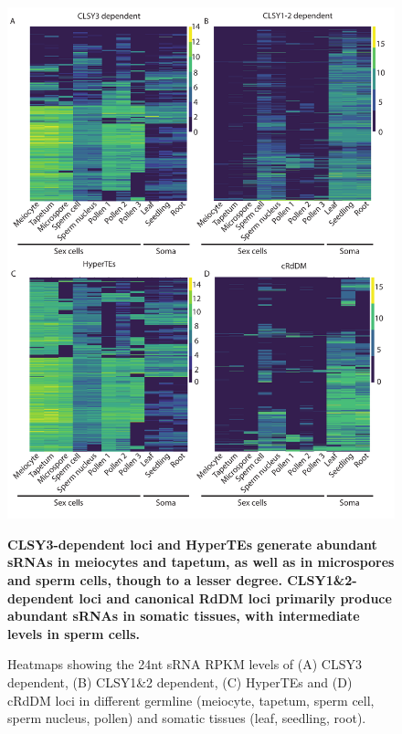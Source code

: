 \begin{figure}[htbp!] 
\centering    
    \includegraphics[width=1\textwidth]{Chapter2/Figs/Figure8_Heatmaps_CLSY3_CLSY1_2vs_cRdDMs_HyperTEs.pdf}
\caption{\textbf{CLSY3-dependent loci and HyperTEs generate abundant sRNAs in meiocytes and tapetum, as well as in microspores and sperm cells, though to a lesser degree. CLSY1\&2-dependent loci and canonical RdDM loci primarily produce abundant sRNAs in somatic tissues, with intermediate levels in sperm cells.}}
\label{fig:hm_CLSY3_CLSY1}
\captionsetup{font=small}
    \caption*{Heatmaps showing the 24nt sRNA RPKM levels of (A) CLSY3 dependent, (B) CLSY1\&2 dependent, (C) HyperTEs and (D) cRdDM loci in different germline (meiocyte, tapetum, sperm cell, sperm nucleus, pollen) and somatic tissues (leaf, seedling, root).}
\end{figure}

